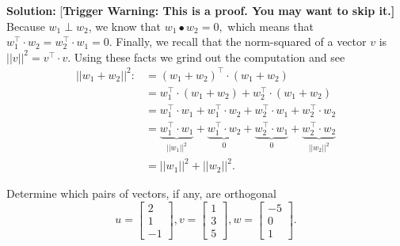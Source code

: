 \textbf{Solution:} [\textbf{\RED Trigger Warning: This is a proof. You may want to skip it.]} Because $w_1 \perp w_2$, we know that $w_1 \bullet w_2=0,$ which means that $w_1^\top \cdot w_2 = w_2^\top \cdot w_1 = 0$. Finally, we recall that the norm-squared of a vector $v$ is  $||v||^2 = v^\top \cdot v$. Using these facts we grind out the computation and see
\begin{align*}
    ||w_1 + w_2||^2:&= (w_1+w_2)^\top \cdot (w_1+w_2)\\
    &= w_1^\top \cdot (w_1 + w_2) + w_2^\top \cdot (w_1 + w_2) \\
  &=w_1^\top \cdot w_1 +  w_1^\top \cdot w_2 +  w_2^\top \cdot w_1 +  w_2^\top \cdot w_2\\
    &= \underbrace{w_1^\top \cdot w_1}_{||w_1||^2} +  \underbrace{w_1^\top \cdot w_2}_{0} +  \underbrace{w_2^\top \cdot w_1}_{0} +  \underbrace{w_2^\top \cdot w_2}_{||w_2||^2} \\
    &= ||w_1||^2 + ||w_2||^2.
\end{align*}  \Qed

\begin{example}
\label{ex:perpendicular}
Determine which pairs of vectors, if any, are orthogonal
$$
u =  \left[ \begin{array}{r} 2 \\ 1 \\ -1\end{array} \right] , v= \left[ \begin{array}{r} 1\\ 3\\ 5 \end{array} \right], w= \left[ \begin{array}{r} -5 \\ 0 \\ 1\end{array} \right].$$
\end{example}
 \vspace*{.5cm}
 
